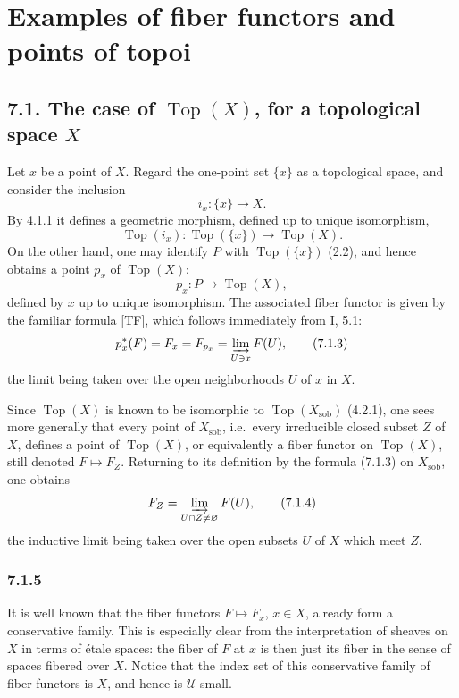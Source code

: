 \documentclass[11pt]{article}
\newcommand{\U}{\mathcal{U}}
\newcommand{\Top}{\operatorname{Top}}
\newcommand{\sob}{\operatorname{sob}}
\newcommand{\ie}{i.e.}
\begin{document}
\setcounter{section}{6}
\section{Examples of fiber functors and points of topoi}

\subsection*{7.1. The case of \(\Top(X)\), for a topological space \(X\)}

Let \(x\) be a point of \(X\). Regard the one-point set \(\{x\}\) as a topological space, and consider the inclusion
\[
i_x:\{x\}\longrightarrow X.
\]
By 4.1.1 it defines a geometric morphism, defined up to unique isomorphism,
\begin{equation*}
\Top(i_x):\Top(\{x\})\longrightarrow\Top(X).\tag{7.1.1}
\end{equation*}
On the other hand, one may identify \(P\) with \(\Top(\{x\})\) (2.2), and hence obtains a point \(p_x\) of \(\Top(X)\):
\begin{equation*}
p_x:P\longrightarrow\Top(X),\tag{7.1.2}
\end{equation*}
defined by \(x\) up to unique isomorphism. The associated fiber functor is given by the familiar formula [TF], which follows immediately from I, 5.1:
\begin{equation*}
p_x^*(F)=F_x=F_{p_x}=\varinjlim_{U\ni x}F(U),\tag{7.1.3}
\end{equation*}
the limit being taken over the open neighborhoods \(U\) of \(x\) in \(X\).

Since \(\Top(X)\) is known to be isomorphic to \(\Top(X_{\sob})\) (4.2.1), one sees more generally that every point of \(X_{\sob}\), \ie\ every irreducible closed subset \(Z\) of \(X\), defines a point of \(\Top(X)\), or equivalently a fiber functor on \(\Top(X)\), still denoted \(F\mapsto F_Z\). Returning to its definition by the formula (7.1.3) on \(X_{\sob}\), one obtains
\begin{equation*}
F_Z=\varinjlim_{U\cap Z\ne\varnothing}F(U),\tag{7.1.4}
\end{equation*}
the inductive limit being taken over the open subsets \(U\) of \(X\) which meet \(Z\).

\subsubsection*{7.1.5}
It is well known that the fiber functors \(F\mapsto F_x\), \(x\in X\), already form a conservative family. This is especially clear from the interpretation of sheaves on \(X\) in terms of \'{e}tale spaces: the fiber of \(F\) at \(x\) is then just its fiber in the sense of spaces fibered over \(X\). Notice that the index set of this conservative family of fiber functors is \(X\), and hence is \(\U\)-small.
\end{document}
